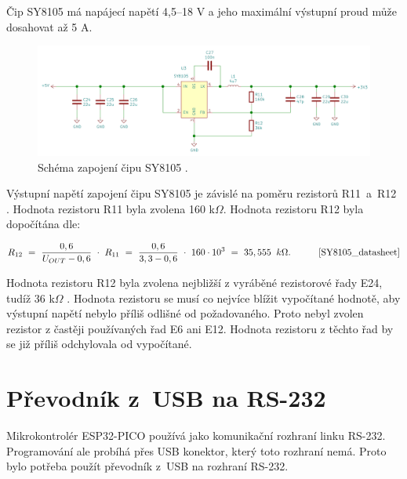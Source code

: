   Čip SY8105 má napájecí napětí 4,5--18 V a jeho maximální výstupní proud může dosahovat až 5 A.

  \begin{figure}[!h]
    \begin{center}
      \includegraphics[scale=0.4]{obrazky/SY8105_schema.png}
    \end{center}
    \caption[Schéma zapojení čipu SY8105 \cite{SY8105_datasheet}]{Schéma zapojení čipu SY8105 \cite{SY8105_datasheet}.}
  \end{figure}

  Výstupní napětí zapojení čipu SY8105 je závislé na poměru rezistorů R11~a~R12 \cite{SY8105_datasheet}. 
  Hodnota rezistoru R11 byla zvolena 160 k$\Omega$. Hodnota rezistoru R12 byla dopočítána dle:

  \begin{equation} 
    R_{12}~=~\frac{0,6}{U_{OUT}-0,6}~\cdot~R_{11}~=~\frac{0,6}{3,3-0,6}~\cdot~160\cdot10^3~=~35,555~\:k\Omega. 
    \quad \quad \quad \cite{SY8105_datasheet}
  \label{eq:R12}
  \end{equation}

  Hodnota rezistoru R12 byla zvolena nejbližší z vyráběné rezistorové řady E24, tudíž 36 k$\Omega$ \cite{Rezistorova_rada}. Hodnota 
  rezistoru se musí co nejvíce blížit vypočítané hodnotě, aby výstupní napětí nebylo příliš odlišné od požadovaného. Proto nebyl
  zvolen rezistor z častěji používaných řad E6 ani E12. Hodnota rezistoru z těchto řad by se již příliš odchylovala od vypočítané.

  \section{Převodník z~USB na RS-232}
  Mikrokontrolér ESP32-PICO používá jako komunikační rozhraní linku RS-232. Programování ale probíhá přes USB konektor, který toto rozhraní
  nemá. Proto bylo potřeba použít převodník z~USB na rozhraní RS-232.
  
